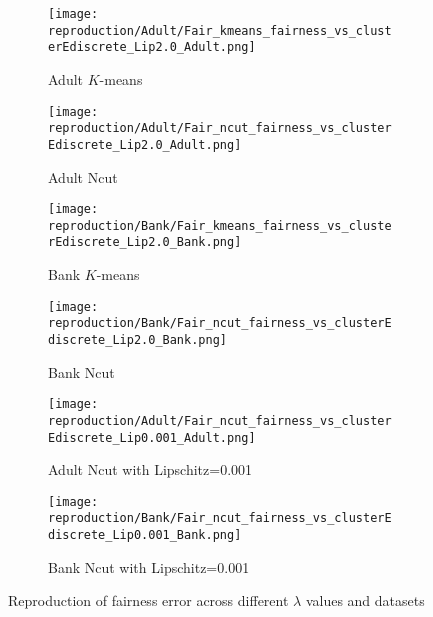 \begin{figure}
    \centering
    \begin{subfigure}{0.24\linewidth}
        \centering
        \texttt{[image: reproduction/Adult/Fair\_kmeans\_fairness\_vs\_clusterEdiscrete\_Lip2.0\_Adult.png]}
        \caption{Adult $K$-means}
        \label{fig:Adult_kmeans_reprod}
    \end{subfigure}
    \begin{subfigure}{0.24\linewidth}
        \centering
        \texttt{[image: reproduction/Adult/Fair\_ncut\_fairness\_vs\_clusterEdiscrete\_Lip2.0\_Adult.png]}
        \caption{Adult Ncut}
        \label{fig:Adult_ncut_reprod}
    \end{subfigure}
    \begin{subfigure}{0.24\linewidth}
        \centering
        \texttt{[image: reproduction/Bank/Fair\_kmeans\_fairness\_vs\_clusterEdiscrete\_Lip2.0\_Bank.png]}
        \caption{Bank $K$-means}
        \label{fig:Bank_kmeans_reprod}
    \end{subfigure}
    \begin{subfigure}{0.24\linewidth}
        \centering
        \texttt{[image: reproduction/Bank/Fair\_ncut\_fairness\_vs\_clusterEdiscrete\_Lip2.0\_Bank.png]}
        \caption{Bank Ncut}
        \label{fig:Bank_ncut_reprod}
    \end{subfigure}
    
    \begin{subfigure}{0.48\linewidth}
        \centering
        \texttt{[image: reproduction/Adult/Fair\_ncut\_fairness\_vs\_clusterEdiscrete\_Lip0.001\_Adult.png]}
        \caption{Adult Ncut with Lipschitz=0.001}
        \label{fig:Adult_ncut_reprod_Lipschitz}
    \end{subfigure}
    \begin{subfigure}{0.48\linewidth}
        \centering
        \texttt{[image: reproduction/Bank/Fair\_ncut\_fairness\_vs\_clusterEdiscrete\_Lip0.001\_Bank.png]}
        \caption{Bank Ncut with Lipschitz=0.001}
        \label{fig:Bank_ncut_reprod_Lipschitz}
    \end{subfigure}    
    \caption{Reproduction of fairness error across different $\lambda$ values and datasets}
    \label{fig:lambda_reprod_plots}
\end{figure}


